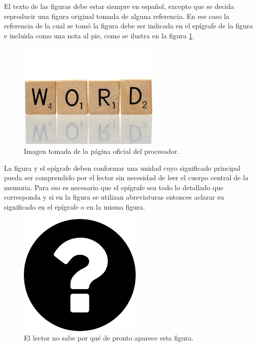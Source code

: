 El texto de las figuras debe estar siempre en español, excepto que se decida reproducir una figura original tomada de alguna referencia. En ese caso la referencia de la cual se tomó la figura debe ser indicada en el epígrafe de la figura e incluida como una nota al pie, como se ilustra en la figura \ref{fig:palabraIngles}.

\begin{figure}[h!]
	\centering
	\includegraphics[scale=.25]{./Figures/word.jpeg}
	\caption{Imagen tomada de la página oficial del procesador\protect\footnotemark.}
	\label{fig:palabraIngles}
\end{figure}



La figura y el epígrafe deben conformar una unidad cuyo significado principal pueda ser comprendido por el lector sin necesidad de leer el cuerpo central de la memoria. Para eso es necesario que el epígrafe sea todo lo detallado que corresponda y si en la figura se utilizan abreviaturas entonces aclarar su significado en el epígrafe o en la misma figura.

\begin{figure}[h]
	\centering
	\includegraphics[scale=.4]{./Figures/questionMark.png}
	\caption{El lector no sabe por qué de pronto aparece esta figura.}
	\label{fig:questionMark}
\end{figure}

